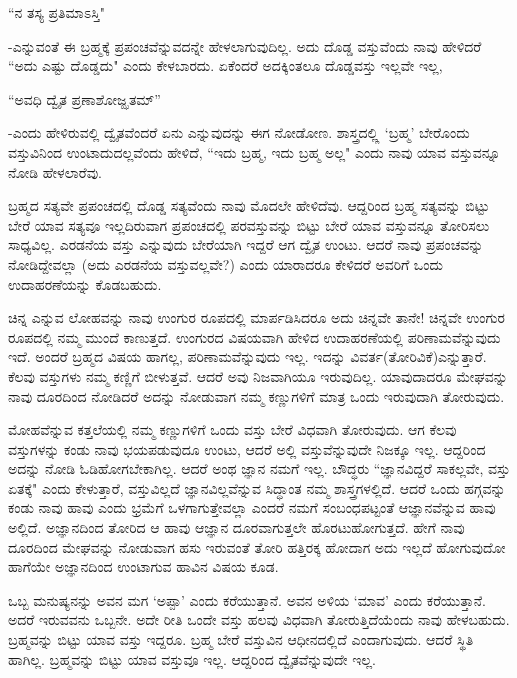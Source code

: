  
 \begin{shloka}
 ``ನ ತಸ್ಯ ಪ್ರತಿಮಾಽಸ್ತಿ"
\end{shloka} 

-ಎನ್ನುವಂತೆ ಈ ಬ್ರಹ್ಮಕ್ಕೆ  ಪ್ರಪಂಚವೆನ್ನುವದನ್ನೇ ಹೇಳಲಾಗುವುದಿಲ್ಲ. ಅದು ದೊಡ್ಡ ವಸ್ತುವೆಂದು ನಾವು ಹೇಳಿದರೆ ``ಅದು ಎಷ್ಟು ದೊಡ್ಡದು" ಎಂದು ಕೇಳಬಾರದು. ಏಕೆಂದರೆ ಅದಕ್ಕಿಂತಲೂ ದೊಡ್ಡವಸ್ತು ಇಲ್ಲವೇ ಇಲ್ಲ, 

\begin{shloka}
``ಅವಧಿ ದ್ವೈತ ಪ್ರಣಾಶೋಜ್ಝತಮ್''
\end{shloka}

-ಎಂದು ಹೇಳಿರುವಲ್ಲಿ ದ್ವೈತವೆಂದರೆ ಏನು ಎನ್ನುವುದನ್ನು ಈಗ ನೋಡೋಣ. ಶಾಸ್ತ್ರದಲ್ಲ್ಲಿ `ಬ್ರಹ್ಮ' ಬೇರೊಂದು ವಸ್ತುವಿನಿಂದ ಉಂಟಾದುದಲ್ಲವೆಂದು ಹೇಳಿದೆ, ``ಇದು ಬ್ರಹ್ಮ, ಇದು ಬ್ರಹ್ಮ ಅಲ್ಲ" ಎಂದು ನಾವು ಯಾವ ವಸ್ತುವನ್ನೂ ನೋಡಿ ಹೇಳಲಾರೆವು. 


ಬ್ರಹ್ಮದ ಸತ್ಯವೇ ಪ್ರಪಂಚದಲ್ಲಿ ದೊಡ್ಡ ಸತ್ಯವೆಂದು ನಾವು ಮೊದಲೇ ಹೇಳಿದೆವು. ಆದ್ದರಿಂದ ಬ್ರಹ್ಮ ಸತ್ಯವನ್ನು ಬಿಟ್ಟು ಬೇರೆ ಯಾವ ಸತ್ಯವೂ ಇಲ್ಲದಿರುವಾಗ ಪ್ರಪಂಚದಲ್ಲಿ ಪರವಸ್ತುವನ್ನು ಬಿಟ್ಟು ಬೇರೆ ಯಾವ ವಸ್ತುವನ್ನೂ ತೋರಿಸಲು ಸಾಧ್ಯವಿಲ್ಲ. ಎರಡನೆಯ ವಸ್ತು ಎನ್ನುವುದು ಬೇರೆಯಾಗಿ ಇದ್ದರೆ ಆಗ ದ್ವೈತ ಉಂಟು. ಆದರೆ ನಾವು ಪ್ರಪಂಚವನ್ನು ನೋಡಿದ್ದೇವಲ್ಲಾ (ಅದು ಎರಡನೆಯ ವಸ್ತುವಲ್ಲವೇ?) ಎಂದು ಯಾರಾದರೂ ಕೇಳಿದರೆ ಅವರಿಗೆ ಒಂದು ಉದಾಹರಣೆಯನ್ನು ಕೊಡಬಹುದು. 

ಚಿನ್ನ ಎನ್ನುವ ಲೋಹವನ್ನು ನಾವು ಉಂಗುರ ರೂಪದಲ್ಲಿ ಮಾರ್ಪಡಿಸಿದರೂ ಅದು ಚಿನ್ನವೇ ತಾನೇ! ಚಿನ್ನವೇ ಉಂಗುರ ರೂಪದಲ್ಲಿ ನಮ್ಮ ಮುಂದೆ ಕಾಣುತ್ತದೆ. ಉಂಗುರದ ವಿಷಯವಾಗಿ ಹೇಳಿದ ಉದಾಹರಣೆಯಲ್ಲಿ ಪರಿಣಾಮವೆನ್ನುವುದು ಇದೆ. ಅಂದರೆ ಬ್ರಹ್ಮದ ವಿಷಯ ಹಾಗಲ್ಲ, ಪರಿಣಾಮವೆನ್ನುವುದು ಇಲ್ಲ. ಇದನ್ನು ವಿವರ್ತ(ತೋರಿವಿಕೆ)ಎನ್ನುತ್ತಾರೆ. ಕೆಲವು ವಸ್ತುಗಳು ನಮ್ಮ ಕಣ್ಣಿಗೆ ಬೀಳುತ್ತವೆ. ಆದರೆ ಅವು ನಿಜವಾಗಿಯೂ ಇರುವುದಿಲ್ಲ. ಯಾವುದಾದರೂ ಮೇಘವನ್ನು ನಾವು ದೂರದಿಂದ  ನೋಡಿದರೆ ಅದನ್ನು ನೋಡುವಾಗ ನಮ್ಮ ಕಣ್ಣುಗಳಿಗೆ ಮಾತ್ರ ಒಂದು ಇರುವುದಾಗಿ ತೋರುವುದು.

ಮೋಹವೆನ್ನುವ ಕತ್ತಲೆಯಲ್ಲಿ ನಮ್ಮ ಕಣ್ಣುಗಳಿಗೆ ಒಂದು ವಸ್ತು ಬೇರೆ ವಿಧವಾಗಿ ತೋರುವುದು. ಆಗ ಕೆಲವು ವಸ್ತುಗಳನ್ನು ಕಂಡು ನಾವು ಭಯಪಡುವುದೂ ಉಂಟು, ಆದರೆ ಅಲ್ಲಿ ವಸ್ತುವೆನ್ನುವುದೇ ನಿಜಕ್ಕೂ ಇಲ್ಲ. ಆದ್ದರಿಂದ ಅದನ್ನು ನೋಡಿ ಓಡಿಹೋಗಬೇಕಾಗಿಲ್ಲ. ಆದರೆ ಅಂಥ ಜ್ಞಾನ ನಮಗೆ ಇಲ್ಲ. ಬೌದ್ಧರು ``ಜ್ಞಾನವಿದ್ದರೆ  ಸಾಕಲ್ಲವೇ, ವಸ್ತು ಏತಕ್ಕೆ" ಎಂದು ಕೇಳುತ್ತಾರೆ, ವಸ್ತುವಿಲ್ಲದೆ ಜ್ಞಾನವಿಲ್ಲವೆನ್ನುವ ಸಿದ್ಧಾಂತ ನಮ್ಮ ಶಾಸ್ತ್ರಗಳಲ್ಲಿದೆ. ಆದರೆ ಒಂದು ಹಗ್ಗವನ್ನು ಕಂಡು ನಾವು ಹಾವು ಎಂದು ಭ್ರಮೆಗೆ ಒಳಗಾಗುತ್ತೇವಲ್ಲಾ ಎಂದರೆ ನಮಗೆ ಸಂಬಂಧಪಟ್ಟಂತೆ ಆಜ್ಞಾನವೆನ್ನುವ ಹಾವು ಅಲ್ಲಿದೆ. ಅಜ್ಞಾನದಿಂದ ತೋರಿದ ಆ ಹಾವು ಆಜ್ಞಾನ ದೂರವಾಗುತ್ತಲೇ ಹೊರಟುಹೋಗುತ್ತದೆ. ಹೇಗೆ ನಾವು ದೂರದಿಂದ ಮೇಘವನ್ನು ನೋಡುವಾಗ ಹಸು ಇರುವಂತೆ ತೋರಿ ಹತ್ತಿರಕ್ಕ ಹೋದಾಗ ಅದು ಇಲ್ಲದೆ ಹೋಗುವುದೋ ಹಾಗೆಯೇ ಅಜ್ಞಾನದಿಂದ ಉಂಟಾಗುವ ಹಾವಿನ ವಿಷಯ ಕೂಡ. 


ಒಬ್ಬ ಮನುಷ್ಯನನ್ನು ಅವನ ಮಗ `ಅಪ್ಪಾ' ಎಂದು ಕರೆಯುತ್ತಾನೆ. ಅವನ ಅಳಿಯ `ಮಾವ'  ಎಂದು ಕರೆಯುತ್ತಾನೆ. ಅದರೆ ಇರುವವನು ಒಬ್ಬನೇ. ಅದೇ ರೀತಿ ಒಂದೇ ವಸ್ತು ಹಲವು ವಿಧವಾಗಿ ತೋರುತ್ತಿದೆಯೆಂದು ನಾವು ಹೇಳಬಹುದು. ಬ್ರಹ್ಮವನ್ನು ಬಿಟ್ಟು ಯಾವ ವಸ್ತು ಇದ್ದರೂ. ಬ್ರಹ್ಮ ಬೇರೆ ವಸ್ತುವಿನ ಆಧೀನದಲ್ಲಿದೆ ಎಂದಾಗುವುದು. ಆದರೆ ಸ್ಥಿತಿ ಹಾಗಿಲ್ಲ. ಬ್ರಹ್ಮವನ್ನು ಬಿಟ್ಟು  ಯಾವ ವಸ್ತುವೂ ಇಲ್ಲ. ಆದ್ದರಿಂದ ದ್ವೈತವೆನ್ನುವುದೇ ಇಲ್ಲ. 

